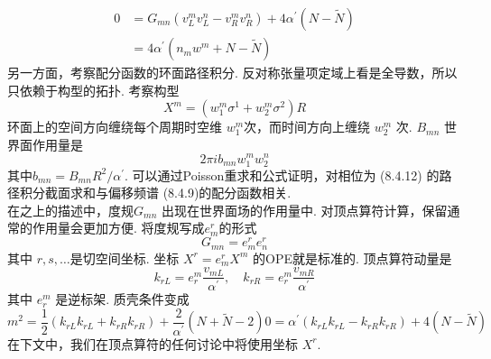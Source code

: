 \begin{equation}
	\begin{aligned}
		0 &=G_{m n}\left(v_{L}^{m} v_{L}^{n}-v_{R}^{m} v_{R}^{n}\right)+4 \alpha^{\prime}(N-\tilde{N}) \\
		&=4 \alpha^{\prime}\left(n_{m} w^{m}+N-\tilde{N}\right)
	\end{aligned}
\end{equation}
另一方面，考察配分函数的环面路径积分. 反对称张量项定域上看是全导数，所以只依赖于构型的拓扑. 考察构型
\begin{equation}
	X^{m}=\left(w_{1}^{m} \sigma^{1}+w_{2}^{m} \sigma^{2}\right) R
\end{equation}
环面上的空间方向缠绕每个周期时空维 $w_{1}^{m}$次，而时间方向上缠绕 $w_{2}^{m}$ 次.  $B_{m n}$ 世界面作用量是
\begin{equation}
	2 \pi i b_{m n} w_{1}^{m} w_{2}^{n}
\end{equation}
其中$b_{m n}=B_{m n} R^{2} / \alpha^{\prime} $. 可以通过Poisson重求和公式证明，对相位为 (8.4.12) 的路径积分截面求和与偏移频谱 (8.4.9)的配分函数相关.\\
在之上的描述中，度规$G_{m n}$ 出现在世界面场的作用量中. 对顶点算符计算，保留通常的作用量会更加方便. 将度规写成$e_{m}^{r}$的形式
\begin{equation}
	G_{m n}=e_{m}^{r} e_{n}^{r}
\end{equation}
其中 $r, s, \ldots$是切空间坐标. 坐标 $X^{r}=e_{m}^{r} X^{m}$ 的OPE就是标准的. 顶点算符动量是
\begin{equation}
	k_{r L}=e_{r}^{m} \frac{v_{m L}}{\alpha^{\prime}}, \quad k_{r R}=e_{r}^{m} \frac{v_{m R}}{\alpha^{\prime}}
\end{equation}
其中 $e_{r}^{m} $ 是逆标架. 质壳条件变成
\begin{subequations}
\begin{equation}
		m^{2} =\frac{1}{2}\left(k_{r L} k_{r L}+k_{r R} k_{r R}\right)+\frac{2}{\alpha^{\prime}}(N+\tilde{N}-2) 
\end{equation}
\begin{equation}		
		0 =\alpha^{\prime}\left(k_{r L} k_{r L}-k_{r R} k_{r R}\right)+4(N-\tilde{N})
\end{equation}
\end{subequations}
在下文中，我们在顶点算符的任何讨论中将使用坐标 $X^{r}$.

